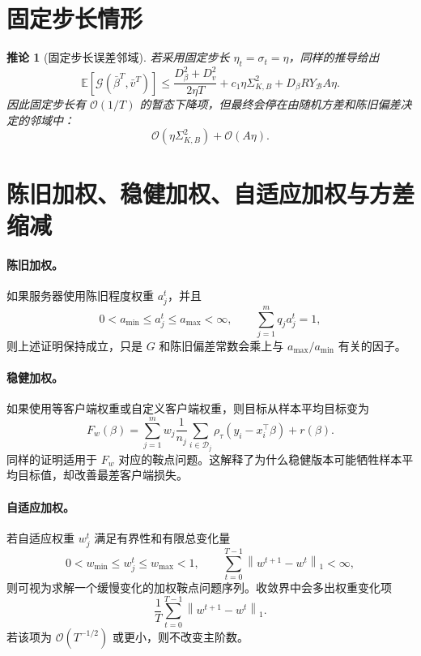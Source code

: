 \documentclass[UTF8,a4paper,11pt]{ctexart}
\newtheorem{corollary}{推论}
\newcommand{\E}{\mathbb{E}}
\newcommand{\B}{\mathcal{B}}
\newcommand{\Gap}{\mathcal{G}}
\newcommand{\norm}[1]{\left\|#1\right\|}
\begin{document}
\section{固定步长情形}

\begin{corollary}[固定步长误差邻域]
若采用固定步长 $\eta_t=\sigma_t=\eta$，同样的推导给出
\begin{equation}
    \E[
    \Gap(\bar{\beta}^T,\bar v^T)
    ]
    \le
    \frac{D_\beta^2+D_v^2}{2\eta T}
    +
    c_1\eta\Sigma_{K,B}^2
    +
    D_\beta RY_\B A\eta.
    \label{eq:fixed-rate}
\end{equation}
因此固定步长有 $\mathcal{O}(1/T)$ 的暂态下降项，但最终会停在由随机方差和陈旧偏差决定的邻域中：
\[
    \mathcal{O}(\eta\Sigma_{K,B}^2)
    +
    \mathcal{O}(A\eta).
\]
\end{corollary}

\section{陈旧加权、稳健加权、自适应加权与方差缩减}

\paragraph{陈旧加权。}
如果服务器使用陈旧程度权重 $a_j^t$，并且
\[
    0<a_{\min}\le a_j^t\le a_{\max}<\infty,
    \qquad
    \sum_{j=1}^m q_j a_j^t=1,
\]
则上述证明保持成立，只是 $G$ 和陈旧偏差常数会乘上与 $a_{\max}/a_{\min}$ 有关的因子。

\paragraph{稳健加权。}
如果使用等客户端权重或自定义客户端权重，则目标从样本平均目标变为
\[
    F_w(\beta)
    =
    \sum_{j=1}^m
    w_j
    \frac{1}{n_j}
    \sum_{i\in\mathcal{D}_j}
    \rho_\tau(y_i-x_i^\top\beta)
    +
    r(\beta).
\]
同样的证明适用于 $F_w$ 对应的鞍点问题。这解释了为什么稳健版本可能牺牲样本平均目标值，却改善最差客户端损失。

\paragraph{自适应加权。}
若自适应权重 $w_j^t$ 满足有界性和有限总变化量
\[
    0<w_{\min}\le w_j^t\le w_{\max}<1,
    \qquad
    \sum_{t=0}^{T-1}\norm{w^{t+1}-w^t}_1<\infty,
\]
则可视为求解一个缓慢变化的加权鞍点问题序列。收敛界中会多出权重变化项
\[
    \frac{1}{T}
    \sum_{t=0}^{T-1}
    \norm{w^{t+1}-w^t}_1.
\]
若该项为 $\mathcal{O}(T^{-1/2})$ 或更小，则不改变主阶数。
\end{document}
